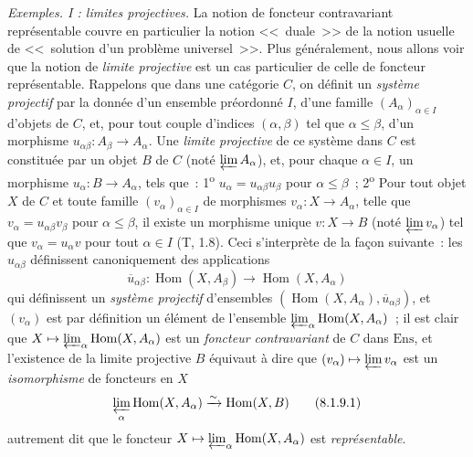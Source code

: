 \begin{env}[8.1.9]
\label{0.8.1.9-fr}
\textit{Exemples. I : limites projectives.} La notion de foncteur
contravariant représentable couvre en particulier la notion <<~duale~>> de
la notion usuelle de <<~solution d'un
problème universel~>>. Plus généralement, nous allons voir que la notion de
\emph{limite projective} est un cas particulier de celle de foncteur
représentable. Rappelons que dans une catégorie $C$, on définit un
\emph{système projectif} par la donnée d'un ensemble préordonné $I$, d'une
famille $(A_\alpha)_{\alpha\in I}$ d'objets de $C$, et, pour tout couple
d'indices $(\alpha,\beta)$ tel que $\alpha\leq\beta$, d'un morphisme
$u_{\alpha\beta}:A_\beta\to A_\alpha$. Une \emph{limite projective} de ce
système dans $C$ est constituée par un objet $B$ de $C$ (noté
$\varprojlim A_\alpha$), et, pour chaque $\alpha\in I$, un morphisme
$u_\alpha:B\to A_\alpha$, tels que~: 1\textsuperscript{o}
$u_\alpha=u_{\alpha\beta}u_\beta$ pour $\alpha\leq\beta$~;
2\textsuperscript{o} Pour tout objet $X$ de $C$ et toute famille
$(v_\alpha)_{\alpha\in I}$ de morphismes $v_\alpha:X\to A_\alpha$, telle
que $v_\alpha=u_{\alpha\beta}v_\beta$ pour $\alpha\leq\beta$, il existe un
morphisme unique $v:X\to B$ (noté $\varprojlim v_\alpha$) tel que
$v_\alpha=u_\alpha v$ pour tout $\alpha\in I$ (T, 1.8). Ceci s'interprète de
la façon suivante~: les $u_{\alpha\beta}$ définissent canoniquement des
applications
\[
  \overline{u}_{\alpha\beta}:\operatorname{Hom}(X,A_\beta)
  \to\operatorname{Hom}(X,A_\alpha)
\]
qui définissent un \emph{système projectif} d'ensembles
$(\operatorname{Hom}(X,A_\alpha),\overline{u}_{\alpha\beta})$, et
$(v_\alpha)$ est par définition un élément de l'ensemble
$\varprojlim_\alpha\operatorname{Hom}(X,A_\alpha)$~; il est clair que
$X\mapsto\varprojlim_\alpha\operatorname{Hom}(X,A_\alpha)$ est un
\emph{foncteur contravariant} de $C$ dans $\mathrm{Ens}$, et l'existence de
la limite projective $B$ équivaut à dire que
$(v_\alpha)\mapsto\varprojlim v_\alpha$ est un \emph{isomorphisme} de
foncteurs en $X$
\[
  \varprojlim_\alpha\operatorname{Hom}(X,A_\alpha)
  \xrightarrow{\sim}\operatorname{Hom}(X,B)
  \tag{8.1.9.1}
\]
autrement dit que le foncteur
$X\mapsto\varprojlim_\alpha\operatorname{Hom}(X,A_\alpha)$ est
\emph{représentable}.
\end{env}

